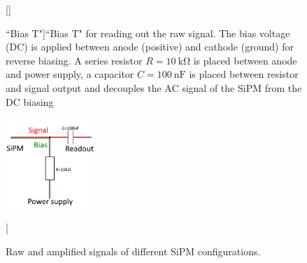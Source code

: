 \begin{figure}[t!]
	[\FBwidth]
	{\caption[``Bias T"]{``Bias T" for reading out the raw signal. The bias voltage (DC) is applied between anode (positive) and cathode (ground) for reverse biasing. A series resistor $R=\SI{10}{\kilo\ohm}$ is placed between anode and power supply, a capacitor $C=\SI{100}{\nano\farad}$ is placed between resistor and signal output and decouples the AC signal of the SiPM from the DC biasing   }    
		\label{fig:ch5:bias_t}}
	{\includegraphics[width=0.3\textwidth]{./graphics/ch5/biast.png}}
\end{figure}
\begin{figure}[b!]
	\hfill
	\hfill
	\caption[Signal shaping]{Raw and amplified signals of different SiPM configurations.}
	\label{fig:ch5:signals}
\end{figure}
